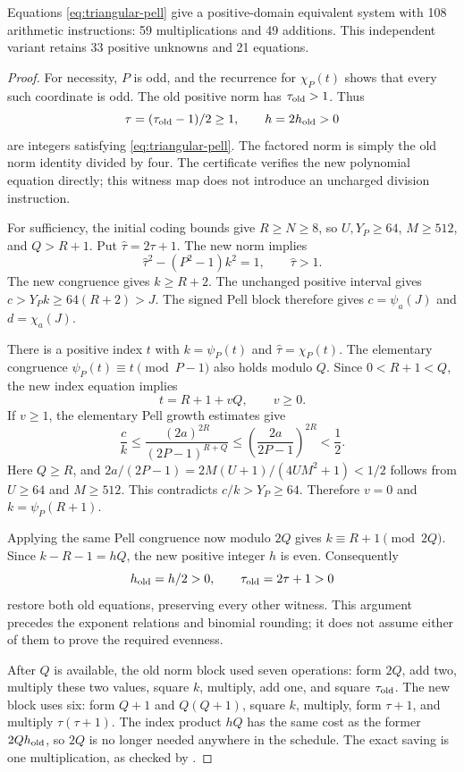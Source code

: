 \begin{proposition}\label{prop:triangular-pell108}
Equations \eqref{eq:triangular-pell} give a positive-domain
equivalent system with 108 arithmetic instructions:
59 multiplications and 49 additions. This independent variant
retains 33 positive unknowns and 21 equations.
\end{proposition}
\begin{proof}
For necessity, $P$ is odd, and the recurrence for $\chi_P(t)$
shows that every such coordinate is odd. The old positive norm
has $\tau_{\rm old}>1$. Thus
\[
 \tau=(\tau_{\rm old}-1)/2\ge1,
 \qquad h=2h_{\rm old}>0
\]
are integers satisfying \eqref{eq:triangular-pell}.
The factored norm is simply the old norm identity divided by four.
The certificate verifies the new polynomial equation directly;
this witness map does not introduce an uncharged division instruction.

For sufficiency, the initial coding bounds give $R\ge N\ge8$,
so $U,Y_P\ge64$, $M\ge512$, and $Q>R+1$.
Put $\widehat\tau=2\tau+1$. The new norm implies
\[
 \widehat\tau^2-(P^2-1)k^2=1,
 \qquad \widehat\tau>1.
\]
The new congruence gives $k\ge R+2$. The unchanged positive
interval gives $c>Y_Pk\ge64(R+2)>J$. The signed Pell block
therefore gives $c=\psi_a(J)$ and $d=\chi_a(J)$.

There is a positive index $t$ with
$k=\psi_P(t)$ and $\widehat\tau=\chi_P(t)$.
The elementary congruence $\psi_P(t)\equiv t\pmod{P-1}$
also holds modulo $Q$. Since $0<R+1<Q$, the new index equation
implies
\[
 t=R+1+vQ,\qquad v\ge0.
\]
If $v\ge1$, the elementary Pell growth estimates give
\[
 \frac ck\le
 \frac{(2a)^{2R}}{(2P-1)^{R+Q}}
 \le\left(\frac{2a}{2P-1}\right)^{2R}<\frac12.
\]
Here $Q\ge R$, and
$2a/(2P-1)=2M(U+1)/(4UM^2+1)<1/2$ follows from
$U\ge64$ and $M\ge512$. This contradicts $c/k>Y_P\ge64$.
Therefore $v=0$ and $k=\psi_P(R+1)$.

Applying the same Pell congruence now modulo $2Q$ gives
$k\equiv R+1\pmod{2Q}$. Since $k-R-1=hQ$, the new positive
integer $h$ is even. Consequently
\[
 h_{\rm old}=h/2>0,\qquad
 \tau_{\rm old}=2\tau+1>0
\]
restore both old equations, preserving every other witness.
This argument precedes the exponent relations and binomial rounding;
it does not assume either of them to prove the required evenness.

After $Q$ is available, the old norm block used seven operations:
form $2Q$, add two, multiply these two values, square $k$,
multiply, add one, and square $\tau_{\rm old}$.
The new block uses six: form $Q+1$ and $Q(Q+1)$, square $k$,
multiply, form $\tau+1$, and multiply $\tau(\tau+1)$.
The index product $hQ$ has the same cost as the former $2Qh_{\rm old}$,
so $2Q$ is no longer needed anywhere in the schedule.
The exact saving is one multiplication, as checked by
.
\end{proof}

